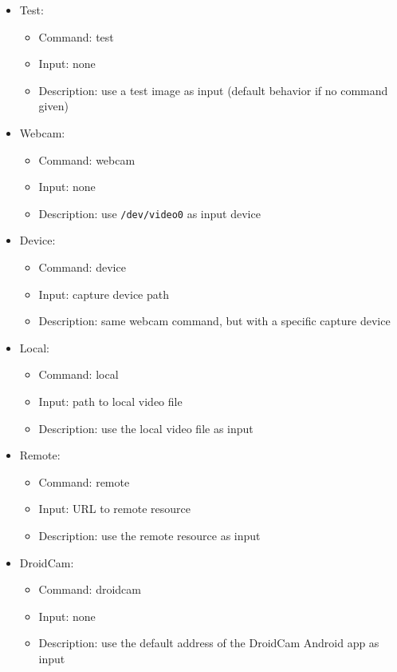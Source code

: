 \begin{itemize}
    \item Test:
    \begin{itemize}
        \item Command: test
        \item Input: none
        \item Description: use a test image as input (default behavior if no command given)
    \end{itemize}
    \item Webcam:
    \begin{itemize}
        \item Command: webcam
        \item Input: none
        \item Description: use \texttt{/dev/video0} as input device
    \end{itemize}
    \item Device:
    \begin{itemize}
        \item Command: device
        \item Input: capture device path
        \item Description: same webcam command, but with a specific capture device
    \end{itemize}
    \item Local:
    \begin{itemize}
        \item Command: local
        \item Input: path to local video file
        \item Description: use the local video file as input
    \end{itemize}
    \item Remote:
    \begin{itemize}
        \item Command: remote
        \item Input: URL to remote resource
        \item Description: use the remote resource as input
    \end{itemize}
    \item DroidCam:
    \begin{itemize}
        \item Command: droidcam
        \item Input: none
        \item Description: use the default address of the DroidCam Android app as input 

\end{itemize}
\end{itemize}
